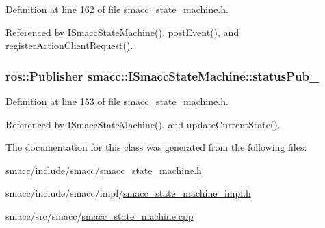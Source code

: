 Definition at line 162 of file smacc\+\_\+state\+\_\+machine.\+h.



Referenced by I\+Smacc\+State\+Machine(), post\+Event(), and register\+Action\+Client\+Request().

\subsubsection[{\texorpdfstring{status\+Pub\+\_\+}{statusPub_}}]{\setlength{\rightskip}{0pt plus 5cm}ros\+::\+Publisher smacc\+::\+I\+Smacc\+State\+Machine\+::status\+Pub\+\_\+\hspace{0.3cm}{\ttfamily [private]}}\hypertarget{classsmacc_1_1ISmaccStateMachine_a7360ef485d5c83a3811dfe3eaa3a0c20}{}\label{classsmacc_1_1ISmaccStateMachine_a7360ef485d5c83a3811dfe3eaa3a0c20}


Definition at line 153 of file smacc\+\_\+state\+\_\+machine.\+h.



Referenced by I\+Smacc\+State\+Machine(), and update\+Current\+State().



The documentation for this class was generated from the following files\+:\begin{DoxyCompactItemize}
\item 
smacc/include/smacc/\hyperlink{smacc__state__machine_8h}{smacc\+\_\+state\+\_\+machine.\+h}\item 
smacc/include/smacc/impl/\hyperlink{smacc__state__machine__impl_8h}{smacc\+\_\+state\+\_\+machine\+\_\+impl.\+h}\item 
smacc/src/smacc/\hyperlink{smacc__state__machine_8cpp}{smacc\+\_\+state\+\_\+machine.\+cpp}\end{DoxyCompactItemize}
